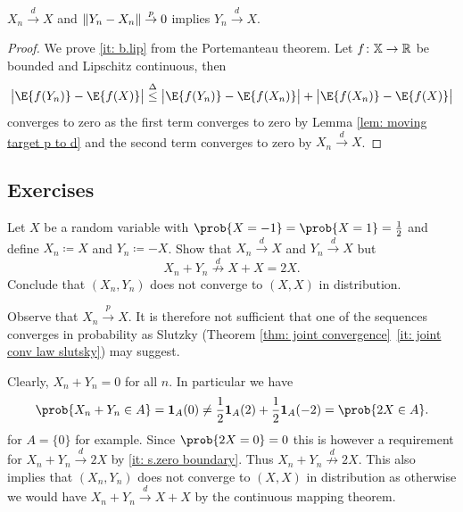 \begin{lemma}
    \label{lem: pull along}
    \(X_n \overset{d}\to X\) and \(\lVert Y_n - X_n\rVert \overset{p}\to 0\) implies \(Y_n \overset{d}\to X\).
\end{lemma}
\begin{proof}
    We prove \ref{it: b.lip} from the Portemanteau theorem.
    Let \(f\colon \mathbb{X} \to \mathbb{R}\) be bounded and Lipschitz continuous, then
    \[
        \abs[\big]{\E{f(Y_n)} - \E{f(X)}}
        \overset{\Delta}\le \abs[\big]{\E{f(Y_n)} - \E{f(X_n)}} + \abs[\big]{\E{f(X_n)} - \E{f(X)}}
    \]
    converges to zero as the first term converges to zero by Lemma \ref{lem:
    moving target p to d} and the second term converges to zero by \(X_n
    \overset{d}\to X\).
\end{proof}


\subsection*{Exercises}

\begin{exercise}
    \label{ex: counterexample joint convergence}
    Let \(X\) be a random variable with \(\prob{X=-1} = \prob{X=1} = \frac12\)
    and define \(X_n \coloneq X\) and \(Y_n \coloneq -X\). Show that \(X_n
    \overset{d}\to X\) and
    \(Y_n \overset{d}\to X\) but 
    \[
        X_n + Y_n \overset{d}{\not\to} X + X = 2X.
    \]
    Conclude that \((X_n, Y_n)\) does not converge to \((X,X)\) in distribution.
    \begin{remark}
        Observe that \(X_n \overset{p}\to X\). It is therefore not sufficient
        that one of the sequences converges in probability as Slutzky (Theorem
        \ref{thm: joint convergence}~\ref{it: joint conv law slutsky}) may
        suggest.
    \end{remark}
    \begin{solution}
        Clearly, \(X_n + Y_n = 0\) for all \(n\). In particular we have
        \[
            \prob{X_n + Y_n \in A} = \ind{A}(0)
            \neq \frac12\ind{A}(2) + \frac12 \ind{A}(-2)
            = \prob{2X \in A}.
        \]
        for \(A= \{0\}\) for example. Since \(\prob{2X = 0} = 0\) this is
        however a requirement for \(X_n + Y_n \overset{d}\to 2X\) by \ref{it:
        s.zero boundary}. Thus \(X_n + Y_n \overset{d}{\not\to} 2X\).  This also
        implies that \((X_n, Y_n)\) does not converge to \((X,X)\) in
        distribution as otherwise we would have \(X_n + Y_n \overset{d}\to X +
        X\) by the continuous mapping theorem.
    \end{solution}
\end{exercise}

